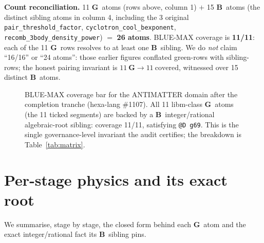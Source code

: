 \documentclass[11pt,a4paper]{article}
\newcommand{\tierBlue}{\textbf{B}}
\newcommand{\tierGreen}{\textbf{G}}
\begin{document}
\noindent\textbf{Count reconciliation.} 11 \tierGreen\ atoms (rows above,
column 1) $+$ 15 \tierBlue\ atoms (the distinct sibling atoms in column 4,
including the 3 original \texttt{pair\_threshold\_factor},
\texttt{cyclotron\_cool\_bexponent}, \texttt{recomb\_3body\_density\_power})
$=$ \textbf{26 atoms}. BLUE-MAX coverage is \textbf{11/11}: each of the 11
\tierGreen\ rows resolves to at least one \tierBlue\ sibling. We do
\emph{not} claim ``16/16'' or ``24 atoms'': those earlier figures conflated
green-rows with sibling-rows; the honest pairing invariant is
$11~\tierGreen \to 11~\text{covered}$, witnessed over 15 distinct
\tierBlue\ atoms.

\begin{figure}[h]
\centering
{}
\caption{BLUE-MAX coverage bar for the ANTIMATTER domain after the
completion tranche (hexa-lang \#1107). All 11 libm-class \tierGreen\ atoms
(the 11 ticked segments) are backed by a \tierBlue\ integer/rational
algebraic-root sibling: coverage 11/11, satisfying \texttt{@D~g69}. This is
the single governance-level invariant the audit certifies; the breakdown is
Table~\ref{tab:matrix}.}
\label{fig:coverage}
\end{figure}

\section{Per-stage physics and its exact root}
\label{sec:physics}

We summarise, stage by stage, the closed form behind each \tierGreen\ atom
and the exact integer/rational fact its \tierBlue\ sibling pins.
\end{document}
